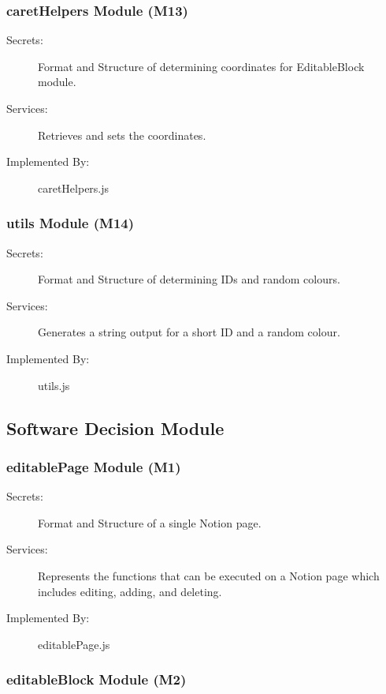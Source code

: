 \documentclass[12pt, titlepage]{article}
\begin{document}
\subsubsection{caretHelpers Module (M13)}

\begin{description}
\item[Secrets:] Format and Structure of determining coordinates for EditableBlock module. 
\item[Services:] Retrieves and sets the coordinates.
\item[Implemented By:] caretHelpers.js
\end{description}

\subsubsection{utils Module (M14)}

\begin{description}
\item[Secrets:] Format and Structure of determining IDs and random colours.
\item[Services:] Generates a string output for a short ID and a random colour.
\item[Implemented By:] utils.js
\end{description}

\subsection{Software Decision Module}

\subsubsection{editablePage Module (M1)}

\begin{description}
\item[Secrets:] Format and Structure of a single Notion page.
\item[Services:] Represents the functions that can be executed on a Notion page which includes editing, adding, and deleting.
\item[Implemented By:] editablePage.js
\end{description}

\subsubsection{editableBlock Module (M2)}
\end{document}
